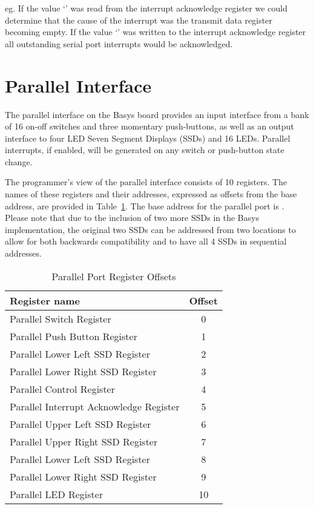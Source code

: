 \noindent
eg. If the value `' was read from the interrupt
acknowledge register we could determine that the cause of the
interrupt was the transmit data register becoming empty. If the value
`' was written to the interrupt acknowledge register all
outstanding serial port interrupts would be acknowledged.

\section{Parallel Interface}

The parallel interface on the Basys board provides an input interface
from a bank of 16 on-off switches and three momentary push-buttons, as
well as an output interface to four LED Seven Segment Displays (SSDs)
and 16 LEDs.
Parallel interrupts, if enabled, will be generated on any switch or
push-button state change.

The programmer's view of the parallel interface consists of 10
registers. The names of these registers and their addresses,
expressed as offsets from the base address, are provided in
Table~\ref{table:parallel_offsets}. The base address for the parallel
port is \src{\LOCPARABASE}. Please note that due to the inclusion of
two more SSDs in the Basys implementation, the original two SSDs can
be addressed from two locations to allow for both backwards compatibility
and to have all 4 SSDs in sequential addresses.

\begin{table}[h]
\begin{center}
\begin{tabular}{|l|c|}
\hline
\textbf{Register name} & \textbf{Offset} \\
\hline
Parallel Switch Register & 0 \\
\hline
Parallel Push Button Register & 1 \\
\hline
Parallel Lower Left SSD Register & 2 \\
\hline
Parallel Lower Right SSD Register & 3 \\
\hline
Parallel Control Register & 4 \\
\hline
Parallel Interrupt Acknowledge Register & 5 \\
\hline
Parallel Upper Left SSD Register & 6 \\
\hline
Parallel Upper Right SSD Register & 7 \\
\hline
Parallel Lower Left SSD Register & 8 \\
\hline
Parallel Lower Right SSD Register & 9 \\
\hline
Parallel LED Register & 10 \\
\hline
\end{tabular}
\caption{Parallel Port Register Offsets}
\label{table:parallel_offsets}
\end{center}
\end{table}

